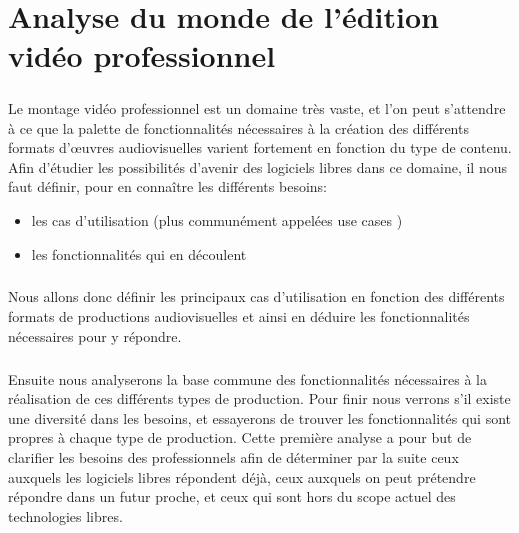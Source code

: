 \onehalfspacing \chapter {Analyse du monde de l'édition vidéo
professionnel}

\minitoc \mtcskip \newpage

\doublespace

\paragraph{}

Le montage vidéo professionnel est un domaine très vaste, et l'on
peut s'attendre à ce que la palette de fonctionnalités nécessaires
à la création des différents formats d'œuvres audiovisuelles
varient fortement en fonction du type de contenu. Afin d'étudier les
possibilités d'avenir des logiciels libres dans ce domaine, il nous
faut définir, pour en connaître les différents besoins:

\begin{itemize} \setlength{\itemsep}{2mm}

  \item {les cas d'utilisation (plus communément appelées use cases
    )} 

  \item {les fonctionnalités qui en découlent}

\end{itemize}


\paragraph{}

Nous allons donc définir les principaux cas d'utilisation en fonction des
différents formats de productions audiovisuelles et ainsi en déduire les
fonctionnalités nécessaires pour y répondre.

\paragraph{}

Ensuite nous analyserons la base commune des fonctionnalités nécessaires
à la réalisation de ces différents types de production.  Pour finir
nous verrons s'il existe une diversité dans les besoins, et essayerons
de trouver les fonctionnalités qui sont propres à chaque type de
production. Cette première analyse a pour but de clarifier les besoins
des professionnels afin de déterminer par la suite ceux auxquels les
logiciels libres répondent déjà, ceux auxquels on peut prétendre
répondre dans un futur proche, et ceux qui sont hors du scope actuel
des technologies libres.

